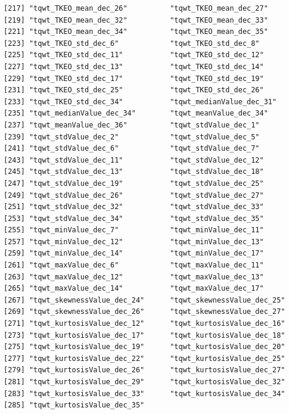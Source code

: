 \documentclass[
]{article}
\begin{document}
\begin{verbatim}
[217] "tqwt_TKEO_mean_dec_26"          "tqwt_TKEO_mean_dec_27"         
[219] "tqwt_TKEO_mean_dec_32"          "tqwt_TKEO_mean_dec_33"         
[221] "tqwt_TKEO_mean_dec_34"          "tqwt_TKEO_mean_dec_35"         
[223] "tqwt_TKEO_std_dec_6"            "tqwt_TKEO_std_dec_8"           
[225] "tqwt_TKEO_std_dec_11"           "tqwt_TKEO_std_dec_12"          
[227] "tqwt_TKEO_std_dec_13"           "tqwt_TKEO_std_dec_14"          
[229] "tqwt_TKEO_std_dec_17"           "tqwt_TKEO_std_dec_19"          
[231] "tqwt_TKEO_std_dec_25"           "tqwt_TKEO_std_dec_26"          
[233] "tqwt_TKEO_std_dec_34"           "tqwt_medianValue_dec_31"       
[235] "tqwt_medianValue_dec_34"        "tqwt_meanValue_dec_34"         
[237] "tqwt_meanValue_dec_36"          "tqwt_stdValue_dec_1"           
[239] "tqwt_stdValue_dec_2"            "tqwt_stdValue_dec_5"           
[241] "tqwt_stdValue_dec_6"            "tqwt_stdValue_dec_7"           
[243] "tqwt_stdValue_dec_11"           "tqwt_stdValue_dec_12"          
[245] "tqwt_stdValue_dec_13"           "tqwt_stdValue_dec_18"          
[247] "tqwt_stdValue_dec_19"           "tqwt_stdValue_dec_25"          
[249] "tqwt_stdValue_dec_26"           "tqwt_stdValue_dec_27"          
[251] "tqwt_stdValue_dec_32"           "tqwt_stdValue_dec_33"          
[253] "tqwt_stdValue_dec_34"           "tqwt_stdValue_dec_35"          
[255] "tqwt_minValue_dec_7"            "tqwt_minValue_dec_11"          
[257] "tqwt_minValue_dec_12"           "tqwt_minValue_dec_13"          
[259] "tqwt_minValue_dec_14"           "tqwt_minValue_dec_17"          
[261] "tqwt_maxValue_dec_6"            "tqwt_maxValue_dec_11"          
[263] "tqwt_maxValue_dec_12"           "tqwt_maxValue_dec_13"          
[265] "tqwt_maxValue_dec_14"           "tqwt_maxValue_dec_17"          
[267] "tqwt_skewnessValue_dec_24"      "tqwt_skewnessValue_dec_25"     
[269] "tqwt_skewnessValue_dec_26"      "tqwt_skewnessValue_dec_27"     
[271] "tqwt_kurtosisValue_dec_12"      "tqwt_kurtosisValue_dec_16"     
[273] "tqwt_kurtosisValue_dec_17"      "tqwt_kurtosisValue_dec_18"     
[275] "tqwt_kurtosisValue_dec_19"      "tqwt_kurtosisValue_dec_20"     
[277] "tqwt_kurtosisValue_dec_22"      "tqwt_kurtosisValue_dec_25"     
[279] "tqwt_kurtosisValue_dec_26"      "tqwt_kurtosisValue_dec_27"     
[281] "tqwt_kurtosisValue_dec_29"      "tqwt_kurtosisValue_dec_32"     
[283] "tqwt_kurtosisValue_dec_33"      "tqwt_kurtosisValue_dec_34"     
[285] "tqwt_kurtosisValue_dec_35"     
\end{verbatim}

\newpage
\end{document}
